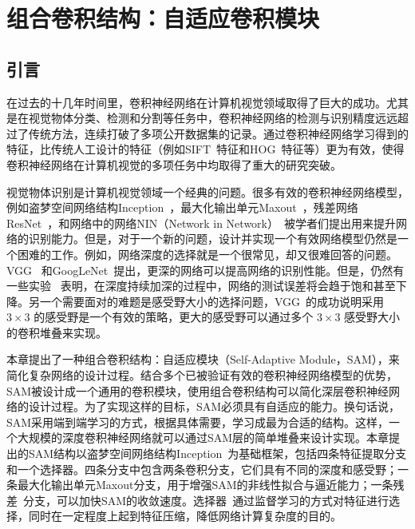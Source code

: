 \chapter{组合卷积结构：自适应卷积模块}
\label{cha:sap}

\section{引言}
\label{sec:sap:introduction}
在过去的十几年时间里，卷积神经网络在计算机视觉领域取得了巨大的成功。尤其是在视觉物体分类、检测和分割等任务中，卷积神经网络的检测与识别精度远远超过了传统方法，连续打破了多项公开数据集的记录。通过卷积神经网络学习得到的特征，比传统人工设计的特征（例如SIFT~\cite{lowe1999object, ke2004pca,ke2004pca}特征和HOG~\cite{dalal2005histograms}特征等）更为有效，使得卷积神经网络在计算机视觉的多项任务中均取得了重大的研究突破。

视觉物体识别是计算机视觉领域一个经典的问题。很多有效的卷积神经网络模型，例如盗梦空间网络结构Inception~\cite{szegedy2014going,szegedy2015rethinking,szegedy2016inception}，最大化输出单元Maxout~\cite{goodfellow2013maxout}，残差网络ResNet~\cite{he2015deep}，和网络中的网络NIN（Network in Network）~\cite{DBLP:journals/corr/LinCY13}被学者们提出用来提升网络的识别能力。但是，对于一个新的问题，设计并实现一个有效网络模型仍然是一个困难的工作。例如，网络深度的选择就是一个很常见，却又很难回答的问题。VGG~\cite{simonyan2014very} 和GoogLeNet~\cite{szegedy2014going}提出，更深的网络可以提高网络的识别性能。但是，仍然有一些实验~\cite{he2015deep} 表明，在深度持续加深的过程中，网络的测试误差将会趋于饱和甚至下降。另一个需要面对的难题是感受野大小的选择问题，VGG~\cite{simonyan2014very}的成功说明采用 $3\times3$ 的感受野是一个有效的策略，更大的感受野可以通过多个 $3\times3$ 感受野大小的卷积堆叠来实现。

本章提出了一种组合卷积结构：自适应模块（Self-Adaptive Module，SAM），来简化复杂网络的设计过程。结合多个已被验证有效的卷积神经网络模型的优势，SAM被设计成一个通用的卷积模块，使用组合卷积结构可以简化深层卷积神经网络的设计过程。为了实现这样的目标，SAM必须具有自适应的能力。换句话说，SAM采用端到端学习的方式，根据具体需要，学习成最为合适的结构。这样，一个大规模的深度卷积神经网络就可以通过SAM层的简单堆叠来设计实现。本章提出的SAM结构以盗梦空间网络结构Inception~\cite{szegedy2014going,szegedy2015rethinking,szegedy2016inception}为基础框架，包括四条特征提取分支和一个选择器。四条分支中包含两条卷积分支，它们具有不同的深度和感受野；一条最大化输出单元Maxout\cite{goodfellow2013maxout}分支，用于增强SAM的非线性拟合与逼近能力；一条残差~\cite{he2015deep}分支，可以加快SAM的收敛速度。选择器~\cite{DBLP:journals/corr/LinCY13}通过监督学习的方式对特征进行选择，同时在一定程度上起到特征压缩，降低网络计算复杂度的目的。

